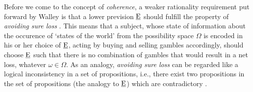 Before we come to the concept of \emph{coherence},
a weaker rationality requirement put forward by Walley is
that a lower prevision $\underline{\operatorname{E}}$ should fulfill the property of
\emph{avoiding sure loss} \parencite[\S 2.4]{1991:walley}.
This means that a subject, whose state of information about the
occurence of `states of the world' from the possibility space $\Omega$
is encoded in his or her choice of $\underline{\operatorname{E}}$,
acting by buying and selling gambles accordingly,
should choose $\underline{\operatorname{E}}$ such that there is no combination of gambles
that would result in a net loss, whatever $\omega \in \Omega$.
As an analogy, \emph{avoiding sure loss} can be regarded
like a logical inconsistency in a set of propositions,
i.e., there exist two propositions in the set of propositions
(the analogy to $\underline{\operatorname{E}}$) which are contradictory
\parencite[\S 2.4, footnote~1]{1991:walley}.

